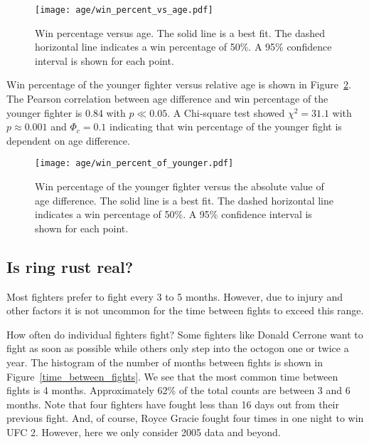 \begin{figure}[h]
\begin{center}
\texttt{[image: age/win\_percent\_vs\_age.pdf]}
\caption{Win percentage versus age. The
solid line is a best fit. The dashed horizontal line indicates
a win percentage of 50\%. A 95\% confidence interval is shown for each point.}
\label{win_pct_abs_age}
\end{center}
\end{figure}

Win percentage of the younger fighter versus relative age
is shown in Figure~\ref{win_pct_rel_age}.
The Pearson correlation between age difference and win percentage of the
younger fighter is 0.84 with $p \ll 0.05$. A Chi-square
test showed $\chi^2=31.1$ with $p \approx 0.001$ and $\Phi_c=0.1$ indicating that win percentage
of the younger fight is dependent on age difference.

\begin{figure}[h]
\begin{center}
\texttt{[image: age/win\_percent\_of\_younger.pdf]}
\caption{Win percentage of the younger fighter versus the absolute
value of age difference. The
solid line is a best fit. The dashed horizontal line indicates
a win percentage of 50\%. A 95\% confidence interval is shown for each point.}
\label{win_pct_rel_age}
\end{center}
\end{figure}

\clearpage
\subsection*{Is ring rust real?}

Most fighters prefer to fight every 3 to 5 months. However, due to injury
and other factors
it is not uncommon
for the time between fights to exceed this range.

How often do individual fighters fight? Some fighters like Donald Cerrone
want to fight as soon as possible while others only step
into the octogon one or twice a year. The histogram of the number of months
between fights is shown in Figure~\ref{time_between_fights}. We see that the most
common time between fights is 4 months. 
Approximately 62\% of the total counts are between 3 and 6 months.
Note that four fighters have fought less than 16 days out from their
previous fight. And, of course, Royce Gracie fought four times in one night
to win UFC 2. However, here we only consider 2005 data and beyond.

